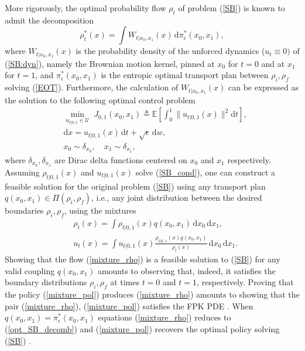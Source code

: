 \documentclass[twoside]{article}
\renewcommand{\eqref}[1]{(\ref{#1})}
\renewcommand{\E}{\mathbb{E}}
\renewcommand{\d}{\mathrm{d}}
\newcommand{\panos}[1]{{\color{red}[Panos: #1]}}
\begin{document}
More rigorously, the optimal probability flow $\rho_t$ of problem \eqref{SB} is known \citep{follmer1988random, chen2021stochastic} to admit the decomposition 
\begin{equation} \label{opt_SB_decomb}
    \rho^*_t(x) = \int W_{t|x_0, x_1}(x) \, \d \pi^*_{\epsilon}(x_0, x_1),
\end{equation}
where $W_{t|x_0, x_1}(x)$ is the probability density of the unforced dynamics ($u_t \equiv 0)$ of \eqref{SB:dyn}, namely the Brownian motion kernel, pinned at $x_0$ for $t=0$ and at $x_1$ for $t=1$, and $\pi^*_{\epsilon}(x_0, x_1)$ is the entropic optimal transport plan between $\rho_i, \rho_f$ solving \eqref{EOT}.
Furthermore, the calculation of $W_{t|x_0, x_1}(x)$ can be expressed as the solution to the following optimal control problem \citep{dai1991stochastic} 
%
\begin{subequations} \label{SB_cond}
\begin{align}
& \min_{u_{t|0,1} \in \mathcal{U}} \; J_{0,1}(x_0, x_1) \triangleq \E \left[ \int_{0}^{1}{ \| u_{t|0,1}(x) \|^2 \d t} \right], \label{SB_cond:cost} \\
& \d x = u_{t|0,1}(x) \, \d t + \sqrt{\epsilon} \,\d w, \label{SB_cond:dyn} \\
& x_0 \sim \delta_{x_0}, \quad x_1 \sim \delta_{x_1},
\end{align}
\end{subequations}
%
where $\delta_{x_0}, \delta_{x_1}$ are Dirac delta functions centered on $x_0$ and $x_1$ respectively. 
Assuming $\rho_{t|0,1}(x)$ and $u_{t|0,1}(x)$ solve \eqref{SB_cond}, 
one can construct a feasible solution for the original problem \eqref{SB} using any transport plan $q(x_0, x_1) \in \Pi(\rho_i, \rho_f)$, i.e., any joint distribution between the desired  boundaries $\rho_i, \rho_f$, using the mixtures 
%
\begin{subequations}
\begin{align}    
    & \rho_t(x) = \int \rho_{t|0,1}(x) q(x_0, x_1) \, \d x_0 \, \d x_1 \label{mixture_rho}, \\
    & u_t(x) = \int u_{t|0,1}(x) \frac{\rho_{t|0,1}(x) q(x_0, x_1) }{\rho_t(x)} \, \d x_0 \, \d x_1. \label{mixture_pol}
\end{align}
\end{subequations}
%
Showing that the flow \eqref{mixture_rho} is a feasible solution to \eqref{SB} for any valid coupling $q(x_0, x_1)$ amounts to observing that, indeed, it satisfies the boundary distributions $\rho_i, \rho_f$ at times $t=0$ and $t=1$, respectively. 
%
Proving that the policy \eqref{mixture_pol} produces \eqref{mixture_rho} amounts to showing that the pair \eqref{mixture_rho}, \eqref{mixture_pol} satisfies the FPK PDE \citep{lipman2022flow, liu2024generalized}.
When $q(x_0, x_1) = \pi^*_{\epsilon}(x_0,x_1)$ equations \eqref{mixture_rho} reduces to \eqref{opt_SB_decomb} and \eqref{mixture_pol} recovers the optimal policy solving \eqref{SB} \citep{shi2023diffusion, peluchetti2023diffusion}.  
\end{document}
